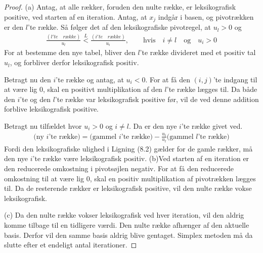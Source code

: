 \begin{proof}
(a) Antag, at alle rækker, foruden den nulte række, er leksikografisk positive, ved starten af en iteration. Antag, at $x_j$ indgår i basen, og pivotrækken er den $l$'te række. Så følger det af den leksikografiske pivotregel, at $u_l>0$ og
\begin{align}
\frac{(l'te \quad række)}{u_l} \overset{L}{<} \frac{(i'te \quad række)}{u_i}, \quad \quad \text{hvis} \quad  i \neq l \quad \text{og} \quad u_i>0
\end{align}
For at bestemme den nye tabel, bliver den $l$'te række divideret med et positiv tal $u_l$, og forbliver derfor leksikografisk positiv. 

Betragt nu den $i$'te række og antag, at $u_i<0$. For at få den $(i,j)$'te indgang til at være lig $0$, skal en positivt multiplikation af den $l$'te række lægges til. Da både den $i$'te og den $l$'te række var leksikografisk positive før, vil de ved denne addition forblive leksikografisk positive.

Betragt nu tilfældet hvor $u_i>0$ og $i \neq l$. Da er den nye $i$'te række givet ved. 
\begin{align*}
(\text{ny $i$'te række)}=\text{(gammel $i$'te række)}-\frac{u_i}{u_l}\text{(gammel $l$'te række)}
\end{align*}  
Fordi den leksikografiske ulighed i Ligning (8.2)  gælder for de gamle rækker, må den nye $i$'te række være leksikografisk positiv. 
(b)Ved starten af en iteration er den reducerede omkostning i pivotsøjlen negativ. For at få den reducerede omkostning til at være lig $0$, skal en positiv multiplikation af pivotrækken lægges til. Da de resterende rækker er leksikografisk positive, vil den nulte række vokse leksikografisk. 

(c) Da den nulte række vokser leksikografisk ved hver iteration, vil den aldrig komme tilbage til en tidligere værdi. Den nulte række afhænger af den aktuelle basis. Derfor vil den samme basis aldrig blive gentaget. Simplex metoden må da slutte efter et endeligt antal iterationer. 
\end{proof}

